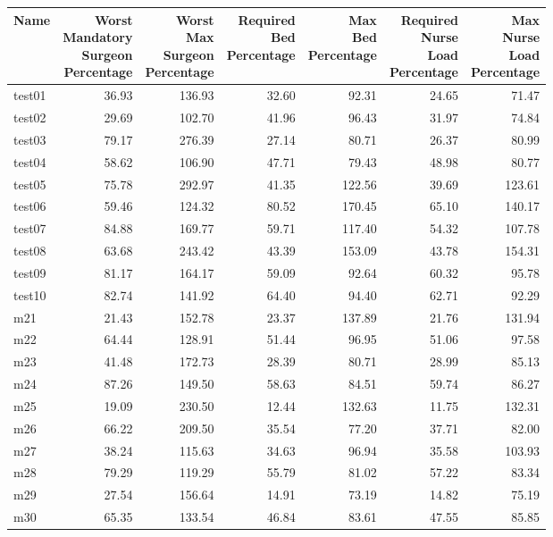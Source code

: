 {\scriptsize
\begin{tabular}{lrrrrrr}
\toprule
Name &\shortstack{Worst\\Mandatory\\Surgeon\\Percentage} &\shortstack{Worst\\Max\\Surgeon\\Percentage} &\shortstack{Required\\Bed\\Percentage} &\shortstack{Max\\Bed\\Percentage} &\shortstack{Required\\Nurse\\Load\\Percentage} &\shortstack{Max\\Nurse\\Load\\Percentage} \\ \midrule
test01&36.93&136.93&32.60&92.31&24.65&71.47\\ 
test02&29.69&102.70&41.96&96.43&31.97&74.84\\ 
test03&79.17&276.39&27.14&80.71&26.37&80.99\\ 
test04&58.62&106.90&47.71&79.43&48.98&80.77\\ 
test05&75.78&\cellcolor{red!10}292.97&41.35&122.56&39.69&123.61\\ 
test06&59.46&124.32&\cellcolor{red!10}80.52&\cellcolor{red!10}170.45&\cellcolor{red!10}65.10&140.17\\ 
test07&84.88&169.77&59.71&117.40&54.32&107.78\\ 
test08&63.68&243.42&43.39&153.09&43.78&\cellcolor{red!10}154.31\\ 
test09&81.17&164.17&59.09&92.64&60.32&95.78\\ 
test10&82.74&141.92&64.40&94.40&62.71&92.29\\ 
m21&21.43&152.78&23.37&137.89&21.76&131.94\\ 
m22&64.44&128.91&51.44&96.95&51.06&97.58\\ 
m23&41.48&172.73&28.39&80.71&28.99&85.13\\ 
m24&\cellcolor{red!10}87.26&149.50&58.63&84.51&59.74&86.27\\ 
m25&19.09&230.50&12.44&132.63&11.75&132.31\\ 
m26&66.22&209.50&35.54&77.20&37.71&82.00\\ 
m27&38.24&115.63&34.63&96.94&35.58&103.93\\ 
m28&79.29&119.29&55.79&81.02&57.22&83.34\\ 
m29&27.54&156.64&14.91&73.19&14.82&75.19\\ 
m30&65.35&133.54&46.84&83.61&47.55&85.85\\ 
\bottomrule
\end{tabular}
}